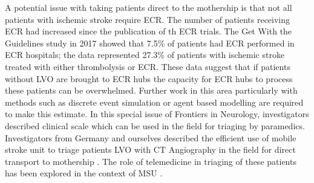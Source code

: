 \documentclass[utf8]{frontiersHLTH}
\begin{document}
A potential issue with taking patients direct to the mothership is
that not all patients with ischemic stroke require ECR. The number of
patients receiving ECR had increased since the publication of th ECR
trials. The Get With the Guidelines study in 2017 showed that 7.5\% of
patients had ECR performed in ECR hospitals; the data represented
27.3\% of patients with ischemic stroke treated with either
thrombolysis or ECR. These data suggest that if patients without LVO
are brought to ECR hubs the capacity for ECR hubs to process these
patients can be overwhelmed. Further work in this area particularly
with methods such as discrete event simulation or agent based
modelling are required to make this estimate. In this special issue of
Frontiers in Neurology, investigators described clinical scale which
can be used in the field for triaging by paramedics. Investigators
from Germany and ourselves described the efficient use of mobile
stroke unit to triage patients LVO with CT Angiography in the field
for direct transport to mothership \cite{10.3389/fneur.2019.00331,
  10.3389/fneur.2019.00159}. The role of telemedicine in triaging of
these patients has been explored in the context of MSU
\cite{10.3389/fneur.2019.00331}.
\end{document}

